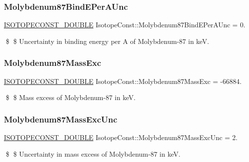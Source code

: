 \subsubsection{\texorpdfstring{Molybdenum87\+Bind\+E\+Per\+A\+Unc}{Molybdenum87BindEPerAUnc}}
{\footnotesize\ttfamily \mbox{\hyperlink{group___isotope_const-_macros_ga8f45a7272ce02c0b4c65c44636ed719a}{I\+S\+O\+T\+O\+P\+E\+C\+O\+N\+S\+T\+\_\+\+D\+O\+U\+B\+LE}} Isotope\+Const\+::\+Molybdenum87\+Bind\+E\+Per\+A\+Unc = 0.}

\$ \$ Uncertainty in binding energy per A of Molybdenum-\/87 in keV. \mbox{\label{group___isotope_const-_molybdenum-_mo87_ga80186329054916aaeb822c23197179e6}} 
\subsubsection{\texorpdfstring{Molybdenum87\+Mass\+Exc}{Molybdenum87MassExc}}
{\footnotesize\ttfamily \mbox{\hyperlink{group___isotope_const-_macros_ga8f45a7272ce02c0b4c65c44636ed719a}{I\+S\+O\+T\+O\+P\+E\+C\+O\+N\+S\+T\+\_\+\+D\+O\+U\+B\+LE}} Isotope\+Const\+::\+Molybdenum87\+Mass\+Exc = -\/66884.}

\$ \$ Mass excess of Molybdenum-\/87 in keV. \mbox{\label{group___isotope_const-_molybdenum-_mo87_ga49088372e8c59908df1df3f58415f292}} 
\subsubsection{\texorpdfstring{Molybdenum87\+Mass\+Exc\+Unc}{Molybdenum87MassExcUnc}}
{\footnotesize\ttfamily \mbox{\hyperlink{group___isotope_const-_macros_ga8f45a7272ce02c0b4c65c44636ed719a}{I\+S\+O\+T\+O\+P\+E\+C\+O\+N\+S\+T\+\_\+\+D\+O\+U\+B\+LE}} Isotope\+Const\+::\+Molybdenum87\+Mass\+Exc\+Unc = 2.}

\$ \$ Uncertainty in mass excess of Molybdenum-\/87 in keV. \mbox{\label{group___isotope_const-_molybdenum-_mo87_ga598e5e36f419c718b6820ecb559890be}} 
